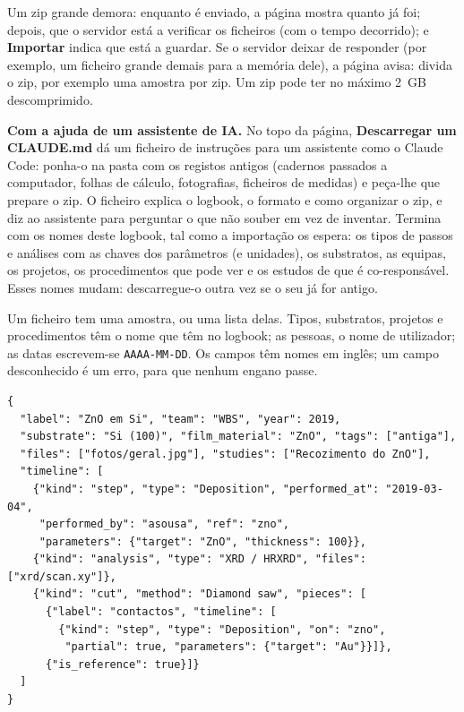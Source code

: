 \documentclass[11pt,a4paper]{article}
\newcommand{\ui}[1]{\textsf{\textbf{#1}}}
\begin{document}
Um zip grande demora: enquanto é enviado, a página mostra quanto já foi; depois,
que o servidor está a verificar os ficheiros (com o tempo decorrido); e
\ui{Importar} indica que está a guardar. Se o servidor deixar de responder (por
exemplo, um ficheiro grande demais para a memória dele), a página avisa: divida o
zip, por exemplo uma amostra por zip. Um zip pode ter no máximo 2~GB descomprimido.

\textbf{Com a ajuda de um assistente de IA.} No topo da página, \ui{Descarregar um
CLAUDE.md} dá um ficheiro de instruções para um assistente como o Claude Code:
ponha-o na pasta com os registos antigos (cadernos passados a computador, folhas de
cálculo, fotografias, ficheiros de medidas) e peça-lhe que prepare o zip. O ficheiro
explica o logbook, o formato e como organizar o zip, e diz ao assistente para
perguntar o que não souber em vez de inventar. Termina com os nomes deste logbook,
tal como a importação os espera: os tipos de passos e análises com as chaves dos
parâmetros (e unidades), os substratos, as equipas, os projetos, os
procedimentos que pode ver e os estudos de que é co-responsável. Esses nomes mudam:
descarregue-o outra vez se o seu já for antigo.

Um ficheiro tem uma amostra, ou uma lista delas. Tipos, substratos, projetos e
procedimentos têm o nome que têm no logbook; as pessoas, o nome de
utilizador; as datas escrevem-se \texttt{AAAA-MM-DD}. Os campos têm nomes em
inglês; um campo desconhecido é um erro, para que nenhum engano passe.

\begin{verbatim}
{
  "label": "ZnO em Si", "team": "WBS", "year": 2019,
  "substrate": "Si (100)", "film_material": "ZnO", "tags": ["antiga"],
  "files": ["fotos/geral.jpg"], "studies": ["Recozimento do ZnO"],
  "timeline": [
    {"kind": "step", "type": "Deposition", "performed_at": "2019-03-04",
     "performed_by": "asousa", "ref": "zno",
     "parameters": {"target": "ZnO", "thickness": 100}},
    {"kind": "analysis", "type": "XRD / HRXRD", "files": ["xrd/scan.xy"]},
    {"kind": "cut", "method": "Diamond saw", "pieces": [
      {"label": "contactos", "timeline": [
        {"kind": "step", "type": "Deposition", "on": "zno",
         "partial": true, "parameters": {"target": "Au"}}]},
      {"is_reference": true}]}
  ]
}
\end{verbatim}
\end{document}
